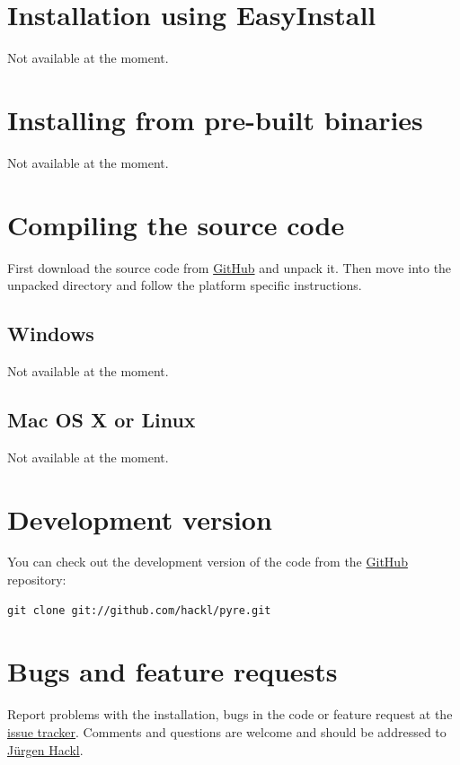 \documentclass[letterpaper,10pt,english]{sphinxmanual}
\begin{document}
\section{Installation using EasyInstall}
\label{install:ipython}\label{install:installation-using-easyinstall}
Not available at the moment.


\section{Installing from pre-built binaries}
\label{install:installing-from-pre-built-binaries}
Not available at the moment.


\section{Compiling the source code}
\label{install:compiling-the-source-code}
First download the source code from \href{https://github.com/hackl/pyre}{GitHub} and unpack it. Then move
into the unpacked directory and follow the platform specific instructions.


\subsection{Windows}
\label{install:windows}
Not available at the moment.


\subsection{Mac OS X or Linux}
\label{install:mac-os-x-or-linux}
Not available at the moment.


\section{Development version}
\label{install:development-version}
You can check out the development version of the code from the \href{https://github.com/hackl/pyre}{GitHub}
repository:

\begin{Verbatim}[commandchars=\\\{\}]
git clone git://github.com/hackl/pyre.git
\end{Verbatim}


\section{Bugs and feature requests}
\label{install:github}\label{install:bugs-and-feature-requests}
Report problems with the installation, bugs in the code or feature request at
the \href{http://github.com/hackl/pyre/issues}{issue tracker}. Comments and questions are welcome and should be
addressed to \href{mailto:hackl.j@gmx.at}{Jürgen Hackl}.
\end{document}
